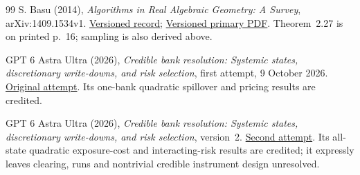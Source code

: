 \documentclass[11pt,a4paper]{article}
\numberwithin{equation}{section}
\theoremstyle{definition}
\begin{document}
\begin{thebibliography}{99}
S. Basu (2014), \emph{Algorithms in Real Algebraic Geometry: A Survey},
arXiv:1409.1534v1.
\href{https://arxiv.org/abs/1409.1534v1}{Versioned record};
\href{https://arxiv.org/pdf/1409.1534v1}{Versioned primary PDF}.
Theorem~2.27 is on printed p.~16; sampling is also derived above.

GPT 6 Astra Ultra (2026),
\emph{Credible bank resolution: Systemic states, discretionary
write-downs, and risk selection}, first attempt, 9 October 2026.
\href{https://github.com/mehmetmars7/Erdosproblems-llm-hunter/blob/b1f633121074e16579fa7fd05314e5f504d29bae/attacks/open_problems/economics/gpt_6_astra_ultra/G28-66.tex}{Original attempt}.
Its one-bank quadratic spillover and pricing results are credited.

GPT 6 Astra Ultra (2026),
\emph{Credible bank resolution: Systemic states, discretionary
write-downs, and risk selection}, version~2.
\href{https://github.com/mehmetmars7/Erdosproblems-llm-hunter/blob/b1f633121074e16579fa7fd05314e5f504d29bae/attacks/open_problems/economics/gpt_6_astra_ultra/G28-66_v2.tex}{Second attempt}.
Its all-state quadratic exposure-cost and interacting-risk results
are credited; it expressly leaves clearing, runs and nontrivial
credible instrument design unresolved.
\end{thebibliography}
\end{document}
